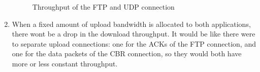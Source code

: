 \documentclass[a4paper,12pt,titlepage]{report}
\begin{document}
\begin{enumerate}
\begin{figure}[htb]
\caption{Throughput of the FTP and UDP connection}
\label{upAndDown}
\end{figure}
\item When a fixed amount of upload bandwidth is allocated to both applications, there wont be a drop in the download throughput. It would be like there were to separate upload connections: one for the ACKs of the FTP connection, and one for the data packets of the CBR connection, so they would both have more or less constant throughput.\\
\end{enumerate}
\end{document}
